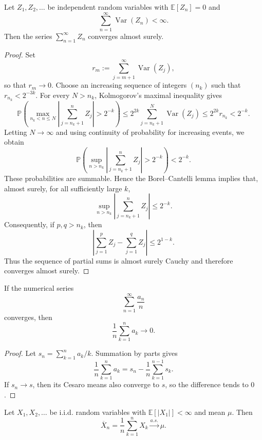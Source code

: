 \begin{lemma}
Let $Z_1,Z_2,\dots$ be independent random variables with $\mathbb{E}[Z_n]=0$ and
\[
    \sum_{n=1}^{\infty}\operatorname{Var}(Z_n)<\infty.
\]
Then the series $\sum_{n=1}^{\infty}Z_n$ converges almost surely.
\end{lemma}

\begin{proof}
Set
\[
    r_m:=\sum_{j=m+1}^{\infty}\operatorname{Var}(Z_j),
\]
so that $r_m\to0$. Choose an increasing sequence of integers $(n_k)$ such that
$r_{n_k}<2^{-3k}$. For every $N>n_k$, Kolmogorov's maximal inequality gives
\[
    \mathbb{P}\left(
    \max_{n_k<n\leq N}
    \left|\sum_{j=n_k+1}^{n}Z_j\right|>2^{-k}
    \right)
    \leq
    2^{2k}\sum_{j=n_k+1}^{N}\operatorname{Var}(Z_j)
    \leq 2^{2k}r_{n_k}<2^{-k}.
\]
Letting $N\to\infty$ and using continuity of probability for increasing events, we obtain
\[
    \mathbb{P}\left(
    \sup_{n>n_k}
    \left|\sum_{j=n_k+1}^{n}Z_j\right|>2^{-k}
    \right)<2^{-k}.
\]
These probabilities are summable. Hence the Borel--Cantelli lemma implies that, almost surely, for all sufficiently large $k$,
\[
    \sup_{n>n_k}
    \left|\sum_{j=n_k+1}^{n}Z_j\right|\leq2^{-k}.
\]
Consequently, if $p,q>n_k$, then
\[
    \left|\sum_{j=1}^{p}Z_j-\sum_{j=1}^{q}Z_j\right|
    \leq 2^{1-k}.
\]
Thus the sequence of partial sums is almost surely Cauchy and therefore converges almost surely.
\end{proof}

\begin{lemma}
If the numerical series
\[
    \sum_{n=1}^{\infty}\frac{a_n}{n}
\]
converges, then
\[
    \frac1n\sum_{k=1}^{n}a_k\longrightarrow0.
\]
\end{lemma}

\begin{proof}
Let $s_n=\sum_{k=1}^{n}a_k/k$. Summation by parts gives
\[
    \frac1n\sum_{k=1}^{n}a_k
    =s_n-\frac1n\sum_{k=1}^{n-1}s_k.
\]
If $s_n\to s$, then its Cesaro means also converge to $s$, so the difference tends to $0$.
\end{proof}

\begin{theorem}
Let $X_1,X_2,\dots$ be i.i.d. random variables with $\mathbb{E}[|X_1|]<\infty$ and mean $\mu$. Then
\[
    \overline{X}_n=\frac1n\sum_{k=1}^{n}X_k
    \xrightarrow{a.s.}\mu.
\]
\end{theorem}


